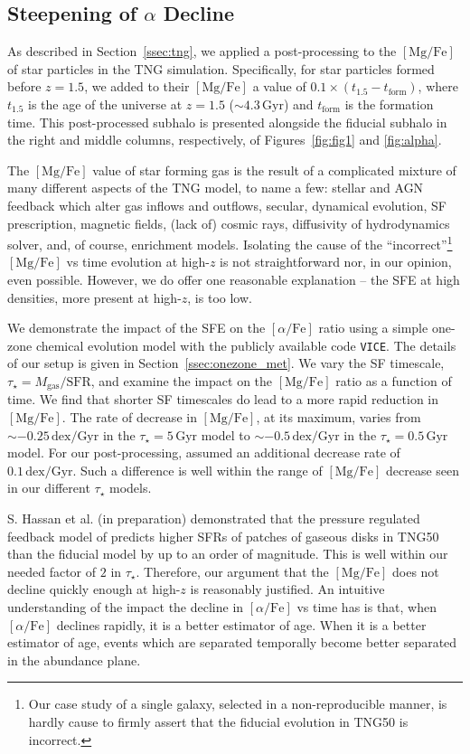 \documentclass[linenumbers, twocolumn]{aastex631}
\newcommand{\Gyr}{\ensuremath{\textrm{Gyr}}}
\newcommand{\MgFe}{\ensuremath{[\textrm{Mg}/\textrm{Fe}]}}
\newcommand{\alphaFe}{\ensuremath{[\alpha/\textrm{Fe}]}}
\newcommand{\dex}{\ensuremath{\textrm{dex}}}
\begin{document}
\subsection{Steepening of $\alpha$ Decline}\label{ssec:sfe}
As described in Section~\ref{ssec:tng}, we applied a post-processing to the \MgFe{} of star particles in the TNG simulation. Specifically, for star particles formed before $z=1.5$, we added to their \MgFe{} a value of $0.1\times\left(t_{1.5}-t_{\textrm{form}}\right)$, where $t_{1.5}$ is the age of the universe at $z=1.5$ ($\sim4.3\,\Gyr$) and $t_{\textrm{form}}$ is the formation time. This post-processed subhalo is presented alongside the fiducial subhalo in the right and middle columns, respectively, of Figures~\ref{fig:fig1} and \ref{fig:alpha}.

The \MgFe{} value of star forming gas is the result of a complicated mixture of many different aspects of the TNG model, to name a few: stellar and AGN feedback which alter gas inflows and outflows, secular, dynamical evolution, SF prescription, magnetic fields, (lack of) cosmic rays, diffusivity of hydrodynamics solver, and, of course, enrichment models. Isolating the cause of the ``incorrect''\footnote{Our case study of a single galaxy, selected in a non-reproducible manner, is hardly cause to firmly assert that the fiducial evolution in TNG50 is incorrect.} \MgFe{} vs time evolution at high-$z$ is not straightforward nor, in our opinion, even possible. However, we do offer one reasonable explanation -- the SFE at high densities, more present at high-$z$, is too low.

We demonstrate the impact of the SFE on the \alphaFe{} ratio using a simple one-zone chemical evolution model with the publicly available code \texttt{VICE}. The details of our setup is given in Section~\ref{ssec:onezone_met}. We vary the SF timescale, $\tau_{\star}=M_{\textrm{gas}}/\textrm{SFR}$, and examine the impact on the \MgFe{} ratio as a function of time. We find that shorter SF timescales do lead to a more rapid reduction in \MgFe{}. The rate of decrease in \MgFe{}, at its maximum, varies from $\sim-0.25\,\dex/\Gyr$ in the $\tau_{\star}=5\,\Gyr$ model to $\sim-0.5\,\dex/\Gyr$ in the $\tau_{\star}=0.5\,\Gyr$ model. For our post-processing, assumed an additional decrease rate of $0.1\,\dex/\Gyr$. Such a difference is well within the range of \MgFe{} decrease seen in our different $\tau_{\star}$ models.

S. Hassan et al. (in preparation) demonstrated that the pressure regulated feedback model of \citet{2022ApJ...936..137O} predicts higher SFRs of patches of gaseous disks in TNG50 than the fiducial model by up to an order of magnitude. This is well within our needed factor of $2$ in $\tau_{\star}$. Therefore, our argument that the \MgFe{} does not decline quickly enough at high-$z$ is reasonably justified. An intuitive understanding of the impact the decline in \alphaFe{} vs time has is that, when \alphaFe{} declines rapidly, it is a better estimator of age. When it is a better estimator of age, events which are separated temporally become better separated in the abundance plane.
\end{document}
